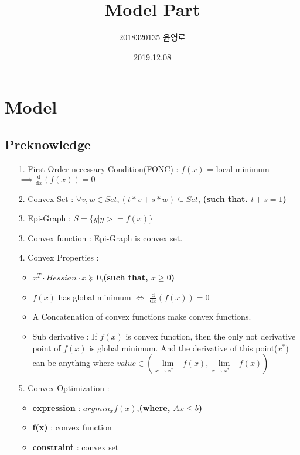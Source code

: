 \documentclass{article}
\title{Model Part}
\author{2018320135 윤영로}
\date{2019.12.08}
\begin{document}
\maketitle

\section{Model}
\subsection{Preknowledge}
\begin{itemize}
    \item[1.] First Order necessary Condition(FONC) : \newline
    $f(x)$ = local minimum $\implies\frac{\mathrm d}{\mathrm d x} \left( f(x) \right)=0$
    \item[2.] Convex Set : $\forall v,w \in Set, (t*v + s*w) \subseteq Set$,   \textbf{(such that. $t+s = 1$)}
    \item[3.] Epi-Graph : $S = \{y | y >= f(x)\}$
    \item[3.] Convex function : Epi-Graph is convex set.
    \item[4.] Convex Properties :
        \begin{itemize}
            \item $x^T \cdot Hessian \cdot x \succeq 0$,\textbf{(such that, $x\geq0$)}
            \item $f(x)$ has global minimum $\iff$ $\frac{\mathrm d}{\mathrm d x} \left( f(x) \right)=0$
            \item A Concatenation of convex functions make convex functions.
            \item Sub derivative : \newline If $f(x)$ is convex function, then the only not derivative point of $f(x)$ is global minimum.
                                  And the derivative of this point($x^*$) can be anything 
                                  where $ value \in (\lim\limits_{x \to x^*-}f(x), \lim\limits_{x \to x^*+}f(x))$
        \end{itemize}
    \item[5.] Convex Optimization : 
        \begin{itemize}
            \item \textbf{expression} : $argmin_x f(x)$,\textbf{(where, $Ax\leq b$)}
            \item \textbf{f(x)} : convex function
            \item \textbf{constraint} : convex set

\end{itemize}
\end{itemize}
\end{document}
